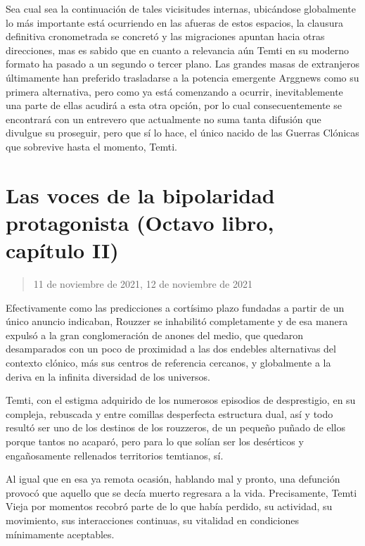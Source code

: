 \documentclass[
  spanish,
]{book}
\begin{document}
Sea cual sea la continuación de tales vicisitudes internas, ubicándose globalmente lo más importante está ocurriendo en las afueras de estos espacios, la clausura definitiva cronometrada se concretó y las migraciones apuntan hacia otras direcciones, mas es sabido que en cuanto a relevancia aún Temti en su moderno formato ha pasado a un segundo o tercer plano. Las grandes masas de extranjeros últimamente han preferido trasladarse a la potencia emergente Arggnews como su primera alternativa, pero como ya está comenzando a ocurrir, inevitablemente una parte de ellas acudirá a esta otra opción, por lo cual consecuentemente se encontrará con un entrevero que actualmente no suma tanta difusión que divulgue su proseguir, pero que sí lo hace, el único nacido de las Guerras Clónicas que sobrevive hasta el momento, Temti.

\hypertarget{las-voces-de-la-bipolaridad-protagonista-octavo-libro-capuxedtulo-ii}{%
\section{Las voces de la bipolaridad protagonista (Octavo libro, capítulo II)}\label{las-voces-de-la-bipolaridad-protagonista-octavo-libro-capuxedtulo-ii}}

\begin{quote}
11 de noviembre de 2021, 12 de noviembre de 2021
\end{quote}

Efectivamente como las predicciones a cortísimo plazo fundadas a partir de un único anuncio indicaban, Rouzzer se inhabilitó completamente y de esa manera expulsó a la gran conglomeración de anones del medio, que quedaron desamparados con un poco de proximidad a las dos endebles alternativas del contexto clónico, más sus centros de referencia cercanos, y globalmente a la deriva en la infinita diversidad de los universos.

Temti, con el estigma adquirido de los numerosos episodios de desprestigio, en su compleja, rebuscada y entre comillas desperfecta estructura dual, así y todo resultó ser uno de los destinos de los rouzzeros, de un pequeño puñado de ellos porque tantos no acaparó, pero para lo que solían ser los desérticos y engañosamente rellenados territorios temtianos, sí.

Al igual que en esa ya remota ocasión, hablando mal y pronto, una defunción provocó que aquello que se decía muerto regresara a la vida. Precisamente, Temti Vieja por momentos recobró parte de lo que había perdido, su actividad, su movimiento, sus interacciones continuas, su vitalidad en condiciones mínimamente aceptables.
\end{document}
